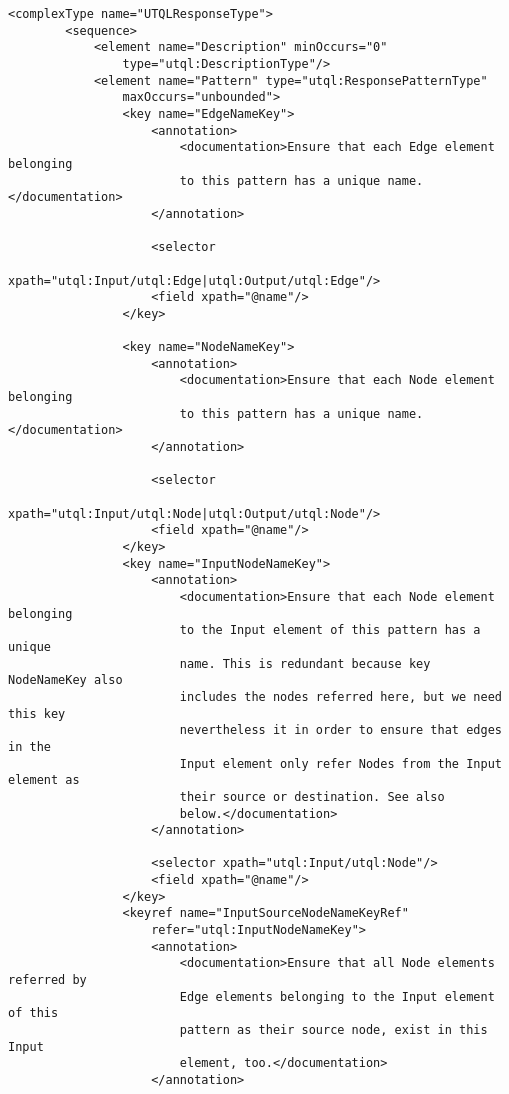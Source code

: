 \documentclass[11pt]{article}
\begin{document}
\begin{Verbatim}[fontsize=\footnotesize,tabsize=2]
    <complexType name="UTQLResponseType">
        <sequence>
            <element name="Description" minOccurs="0"
				type="utql:DescriptionType"/>
            <element name="Pattern" type="utql:ResponsePatternType"
				maxOccurs="unbounded">
                <key name="EdgeNameKey">
                    <annotation>
                        <documentation>Ensure that each Edge element belonging
                        to this pattern has a unique name.</documentation>
                    </annotation>
                    
                    <selector
						xpath="utql:Input/utql:Edge|utql:Output/utql:Edge"/>
                    <field xpath="@name"/>
                </key>
                
                <key name="NodeNameKey">
                    <annotation>
                        <documentation>Ensure that each Node element belonging
                        to this pattern has a unique name.</documentation>
                    </annotation>
                    
                    <selector
						xpath="utql:Input/utql:Node|utql:Output/utql:Node"/>
                    <field xpath="@name"/>
                </key>
                <key name="InputNodeNameKey">
                    <annotation>
                        <documentation>Ensure that each Node element belonging
                        to the Input element of this pattern has a unique
                        name. This is redundant because key NodeNameKey also
                        includes the nodes referred here, but we need this key
                        nevertheless it in order to ensure that edges in the
                        Input element only refer Nodes from the Input element as
                        their source or destination. See also
                        below.</documentation>
                    </annotation>
                    
                    <selector xpath="utql:Input/utql:Node"/>
                    <field xpath="@name"/>
                </key>
                <keyref name="InputSourceNodeNameKeyRef"
                    refer="utql:InputNodeNameKey">
                    <annotation>
                        <documentation>Ensure that all Node elements referred by
                        Edge elements belonging to the Input element of this
                        pattern as their source node, exist in this Input
                        element, too.</documentation>
                    </annotation>
                    

\end{Verbatim}
\end{document}
